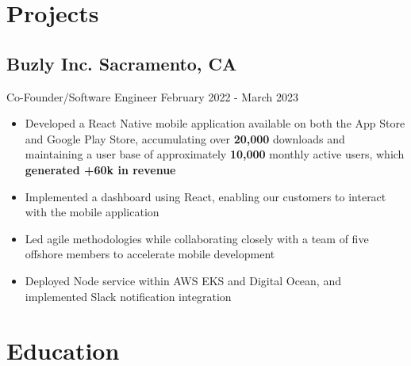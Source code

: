 \documentclass[a4,10pt]{article}
\newcommand{\subtext}[1]{
#1\par\vspace{-0.2cm}}
\newenvironment{zitemize}{
\begin{itemize}\itemsep0pt \parskip0pt \parsep1pt}
{\end{itemize}\vspace{-0.5cm}}
\begin{document}
\section{Projects} %


\subsection*{Buzly Inc. \hfill Sacramento, CA} 
\subtext{Co-Founder/Software Engineer \hfill February 2022 - March 2023} 
    \begin{zitemize}
        \item Developed a React Native mobile application available on both the App Store and Google Play Store, accumulating over \textbf{20,000} downloads and maintaining a user base of approximately \textbf{10,000} monthly active users, which \textbf{generated +60k in revenue}
        \item Implemented a dashboard using React, enabling our customers to interact with the mobile application
        \item Led agile methodologies while collaborating closely with a team of five offshore members to accelerate mobile development
        \item Deployed Node service within AWS EKS and Digital Ocean, and implemented Slack notification integration
    \end{zitemize}


\vspace{-0.30cm}
\section{Education}
\end{document}
